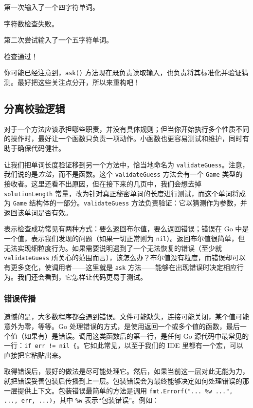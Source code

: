 \begin{codeannotations}
  \item 第一次输入了一个四字符单词。
  \item 字符数检查失败。
  \item 第二次尝试输入了一个五字符单词。
  \item 检查通过！
\end{codeannotations}

你可能已经注意到，\texttt{ask()} 方法现在既负责读取输入，也负责将其标准化并验证猜测。最好把这些关注点分开，所以来重构吧！

\subsection{分离校验逻辑}

对于一个方法应该承担哪些职责，并没有具体规则；但当你开始执行多个性质不同的操作时，最好让一个函数只负责一项动作。小函数也更容易测试和维护，同时有助于确保代码健壮。

让我们把单词长度验证移到另一个方法中，恰当地命名为 \texttt{validateGuess}。注意，我们说的是\emph{方法}，而不是函数。这个 \texttt{validateGuess} 方法会有一个 \texttt{Game} 类型的接收者。这里还看不出原因，但在接下来的几页中，我们会想去掉 \texttt{solutionLength} 常量，改为针对真正秘密单词的长度进行测试，而这个单词将成为 \texttt{Game} 结构体的一部分。\texttt{validateGuess} 方法负责验证：它以猜测作为参数，并返回该单词是否有效。

表示检查成功常见有两种方式：要么返回布尔值，要么返回错误；错误在 Go 中是一个值，表示我们发现的问题（如果一切正常则为 \texttt{nil}）。返回布尔值很简单，但
无法实现细粒度行为。如果需要说明遇到了一个无法恢复的错误（至少就 \texttt{validateGuess} 所关心的范围而言），该怎么办？布尔值没有粒度，而错误却可以有更多变化，使调用者——这里就是 \texttt{ask} 方法——能够在出现错误时决定相应行为。我们还会看到，它怎样让代码更易于测试。

\subsubsection*{错误传播}

遗憾的是，大多数程序都会遇到错误。文件可能缺失，连接可能关闭，某个值可能意外为零，等等。Go 处理错误的方式，是使用返回一个或多个值的函数，最后一个值（如果有）是错误。调用这类函数后的第一行，是任何 Go 源代码中最常见的一行：\texttt{if err != nil \{}。它如此常见，以至于我们的 IDE 里都有一个宏，可以直接把它粘贴出来。

取得错误后，最好的做法是尽可能处理它。然后，如果当前这一层对此无能为力，就把错误妥善包装后传播到上一层。包装错误会为最终能够决定如何处理错误的那一层提供上下文。包装错误最简单的方法是调用 \texttt{fmt.Errorf("... \%w ...", ..., err, ...)}，其中 \texttt{\%w} 表示“包装错误”。例如：

